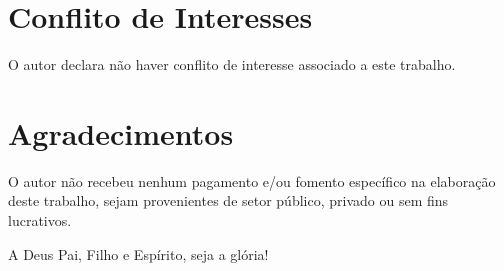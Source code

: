 
\section*{Conflito de Interesses}

    O autor declara não haver conflito de interesse associado a este trabalho.



\section*{Agradecimentos}

    O autor não recebeu nenhum pagamento e/ou fomento específico na elaboração  deste  trabalho,  sejam  provenientes  de  setor
    público, privado ou sem fins lucrativos.

    A \YA{} Deus Pai, Filho e Espírito, seja a glória!




